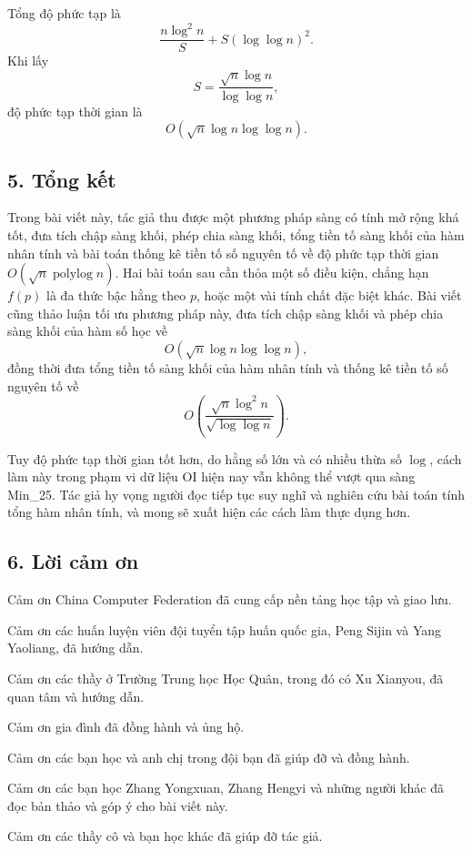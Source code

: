 \documentclass[11pt]{article}
\begin{document}
Tổng độ phức tạp là
\[
  \frac{n\log^2 n}{S}+S(\log\log n)^2.
\]
Khi lấy
\[
  S=\frac{\sqrt n\log n}{\log\log n},
\]
độ phức tạp thời gian là
\[
  O(\sqrt n\log n\log\log n).
\]

\subsection*{5. Tổng kết}

Trong bài viết này, tác giả thu được một phương pháp sàng có tính mở rộng khá
tốt, đưa tích chập sàng khối, phép chia sàng khối, tổng tiền tố sàng khối của
hàm nhân tính và bài toán thống kê tiền tố số nguyên tố về độ phức tạp thời
gian \(O(\sqrt n\operatorname{polylog} n)\). Hai bài toán sau cần thỏa một số
điều kiện, chẳng hạn \(f(p)\) là đa thức bậc hằng theo \(p\), hoặc một vài tính
chất đặc biệt khác. Bài viết cũng thảo luận tối ưu phương pháp này, đưa tích
chập sàng khối và phép chia sàng khối của hàm số học về
\[
  O(\sqrt n\log n\log\log n),
\]
đồng thời đưa tổng tiền tố sàng khối của hàm nhân tính và thống kê tiền tố số
nguyên tố về
\[
  O\left(\frac{\sqrt n\log^2 n}{\sqrt{\log\log n}}\right).
\]

Tuy độ phức tạp thời gian tốt hơn, do hằng số lớn và có nhiều thừa số \(\log\),
cách làm này trong phạm vi dữ liệu OI hiện nay vẫn không thể vượt qua sàng
Min\_25. Tác giả hy vọng người đọc tiếp tục suy nghĩ và nghiên cứu bài toán
tính tổng hàm nhân tính, và mong sẽ xuất hiện các cách làm thực dụng hơn.

\subsection*{6. Lời cảm ơn}

Cảm ơn China Computer Federation đã cung cấp nền tảng học tập và giao lưu.

Cảm ơn các huấn luyện viên đội tuyển tập huấn quốc gia, Peng Sijin và Yang
Yaoliang, đã hướng dẫn.

Cảm ơn các thầy ở Trường Trung học Học Quân, trong đó có Xu Xianyou, đã quan
tâm và hướng dẫn.

Cảm ơn gia đình đã đồng hành và ủng hộ.

Cảm ơn các bạn học và anh chị trong đội bạn đã giúp đỡ và đồng hành.

Cảm ơn các bạn học Zhang Yongxuan, Zhang Hengyi và những người khác đã đọc bản
thảo và góp ý cho bài viết này.

Cảm ơn các thầy cô và bạn học khác đã giúp đỡ tác giả.
\end{document}
